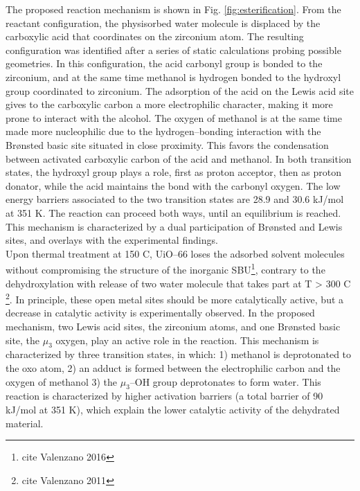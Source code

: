 The proposed reaction mechanism is shown in Fig. \ref{fig:esterification}. From the reactant configuration, the physisorbed water molecule is displaced by the carboxylic acid that coordinates on the zirconium atom. The resulting configuration was identified after a series of static calculations probing possible geometries. In this configuration, the acid carbonyl group is bonded to the zirconium, and at the same time methanol is hydrogen bonded to the hydroxyl group coordinated to zirconium. The adsorption of the acid on the Lewis acid site gives to the carboxylic carbon a more electrophilic character, making it more prone to interact with the alcohol. The oxygen of methanol is at the same time made more nucleophilic due to the hydrogen--bonding interaction with the Br\o{}nsted basic site situated in close proximity. This favors the condensation between activated carboxylic carbon of the acid and methanol. In both transition states, the hydroxyl group plays a role, first as proton acceptor, then as proton donator, while the acid maintains the bond with the carbonyl oxygen. The low energy barriers associated to the two transition states are 28.9 and 30.6 kJ/mol at 351 K. The reaction can proceed both ways, until an equilibrium is reached. This mechanism is characterized by a dual participation of Br\o{}nsted and Lewis sites, and overlays with the experimental findings. \\

Upon thermal treatment at 150 C, UiO--66 loses the adsorbed solvent molecules without compromising the structure of the inorganic SBU\footnote{cite Valenzano 2016}, contrary to the dehydroxylation with release of two water molecule that takes part at T > 300 C \footnote{cite Valenzano 2011}. In principle, these open metal sites should be more catalytically active, but a decrease in catalytic activity is experimentally observed. In the proposed mechanism, two Lewis acid sites, the zirconium atoms, and one Br\o{}nsted basic site, the $\mu_3$ oxygen, play an active role in the reaction. This mechanism is characterized by three transition states, in which: 1) methanol is deprotonated to the oxo atom, 2) an adduct is formed between the electrophilic carbon and the oxygen of methanol 3) the $\mu_3$--OH group deprotonates to form water. This reaction is characterized by higher activation barriers (a total barrier of 90 kJ/mol at 351 K), which explain the lower catalytic activity of the dehydrated material.\\

